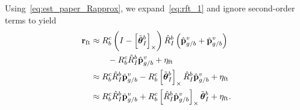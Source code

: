 Using~\eqref{eq:est_paper_Rapprox}, we expand~\eqref{eq:rft_1} and ignore
second-order terms to yield
\begin{align}
   \boldsymbol{\mathrm{r}}_{\text{ft}} &\approx R_b^c \left( I -
   \left[ \tilde{\boldsymbol{\mathrm{\theta}}}_I^b  \right]_{\times}\right) \hat{R}_I^b \left(
 \hat{\boldsymbol{\mathrm{p}}}_{g/b}^v + \tilde{\boldsymbol{\mathrm{p}}}_{g/b}^v \right) \\
                        & \qquad - R_b^c \hat{R}_I^b \hat{\boldsymbol{\mathrm{p}}}_{g/b}^v +
                          \eta_{\text{ft}} \nonumber \\
  &\approx R_b^c \hat{R}_I^b \tilde{\boldsymbol{\mathrm{p}}}_{g/b}^v -
  R_b^c \left[ \tilde{\boldsymbol{\mathrm{\theta}}}_I^b  \right]_{\times} \hat{R}_I^b \hat{\boldsymbol{\mathrm{p}}}_{g/b}^v 
      + \eta_{\text{ft}} \\
&\approx R_b^c \hat{R}_I^b \tilde{\boldsymbol{\mathrm{p}}}_{g/b}^v + R_b^c \left[ \hat{R}_I^b \hat{\boldsymbol{\mathrm{p}}}_{g/b}^v \right]_{\times} \tilde{\boldsymbol{\mathrm{\theta}}}_I^b 
      + \eta_{\text{ft}}.
\end{align}
